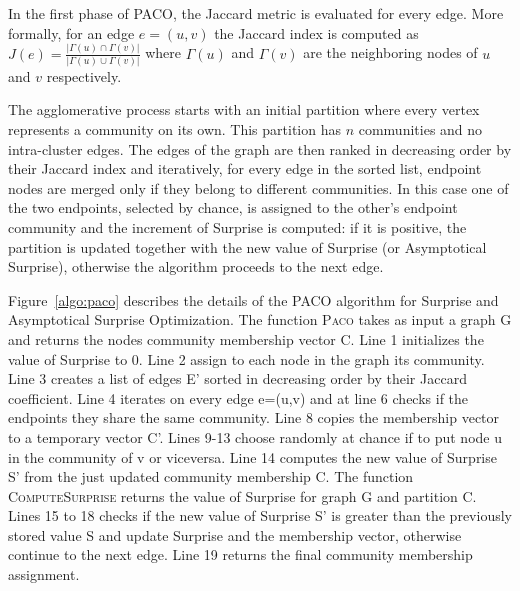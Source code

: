 In the first phase of PACO, the Jaccard metric is evaluated for every edge. More formally, for an edge $e=(u,v)$ the Jaccard index is computed as $J(e)=\frac{|\Gamma(u) \cap \Gamma(v)|}{|\Gamma(u) \cup \Gamma(v)|}$ where $\Gamma(u)$ and $\Gamma(v)$ are the neighboring nodes of $u$ and $v$ respectively.

The agglomerative process starts with an initial partition where every vertex represents a community on its own.
This partition has $n$ communities and no intra-cluster edges.
The edges of the graph are then ranked in decreasing order by their Jaccard index and iteratively, for every edge in the sorted list, endpoint nodes are merged only if they belong to different communities.
In this case one of the two endpoints, selected by chance, is assigned to the other's endpoint community and the increment of Surprise is computed: if it is positive, the partition is updated together with the new value of Surprise (or Asymptotical Surprise), otherwise the algorithm proceeds to the next edge. 

Figure~\ref{algo:paco} describes the details of the PACO algorithm for Surprise and Asymptotical Surprise Optimization.
The function \textsc{Paco} takes as input a graph G and returns the nodes community membership vector C. Line 1 initializes the value of Surprise to 0. Line 2 assign to each node in the graph its community. Line 3 creates a list of edges E' sorted in decreasing order by their Jaccard coefficient. Line 4 iterates on every edge e=(u,v) and at line 6 checks if the endpoints they share the same community. Line 8 copies the membership vector to a temporary vector C'. Lines 9-13 choose randomly at chance if to put node u in the community of v or viceversa. Line 14 computes the new value of Surprise S' from the just updated community membership C. The function \textsc{ComputeSurprise} returns the value of Surprise for graph G and partition C. Lines 15 to 18 checks if the new value of Surprise S' is greater than the previously stored value S and update Surprise and the membership vector, otherwise continue to the next edge. Line 19 returns the final community membership assignment.



